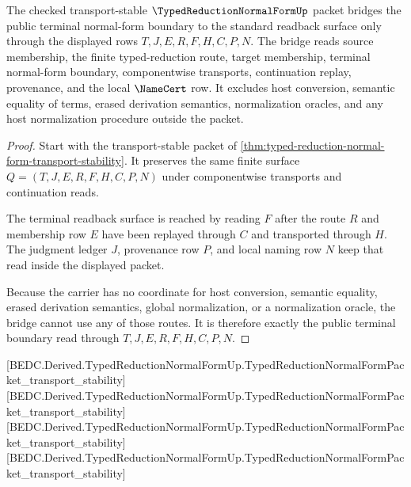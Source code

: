 \begin{theorem}
\label{thm:typed-reduction-normal-form-terminal-readback-bridge}
The checked transport-stable $\TypedReductionNormalFormUp$ packet bridges the public terminal normal-form boundary to the standard readback surface only through the displayed rows $T,J,E,R,F,H,C,P,N$. The bridge reads source membership, the finite typed-reduction route, target membership, terminal normal-form boundary, componentwise transports, continuation replay, provenance, and the local $\NameCert$ row. It excludes host conversion, semantic equality of terms, erased derivation semantics, normalization oracles, and any host normalization procedure outside the packet.
\end{theorem}
\begin{proof}
Start with the transport-stable packet of \autoref{thm:typed-reduction-normal-form-transport-stability}. It preserves the same finite surface $Q=(T,J,E,R,F,H,C,P,N)$ under componentwise transports and continuation reads.

The terminal readback surface is reached by reading $F$ after the route $R$ and membership row $E$ have been replayed through $C$ and transported through $H$. The judgment ledger $J$, provenance row $P$, and local naming row $N$ keep that read inside the displayed packet.

Because the carrier has no coordinate for host conversion, semantic equality, erased derivation semantics, global normalization, or a normalization oracle, the bridge cannot use any of those routes. It is therefore exactly the public terminal boundary read through $T,J,E,R,F,H,C,P,N$.
\end{proof}

[BEDC.Derived.TypedReductionNormalFormUp.TypedReductionNormalFormPacket\_transport\_stability]
[BEDC.Derived.TypedReductionNormalFormUp.TypedReductionNormalFormPacket\_transport\_stability]
[BEDC.Derived.TypedReductionNormalFormUp.TypedReductionNormalFormPacket\_transport\_stability]
[BEDC.Derived.TypedReductionNormalFormUp.TypedReductionNormalFormPacket\_transport\_stability]

